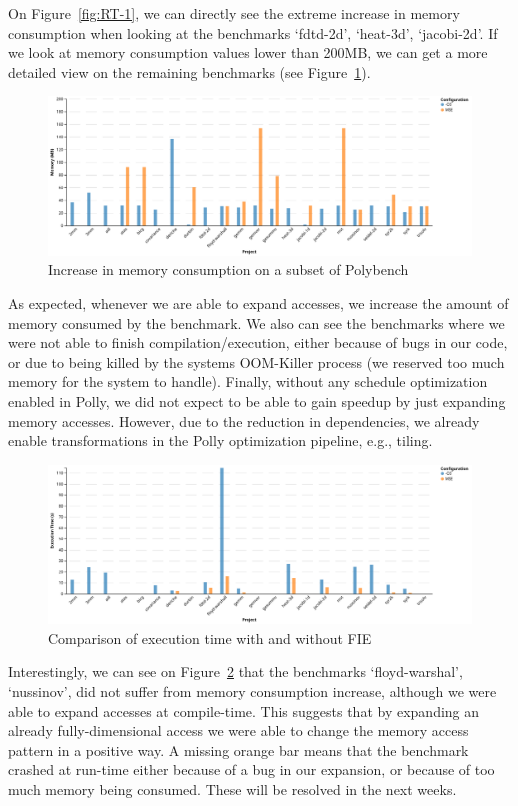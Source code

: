 On Figure~\ref{fig:RT-1}, we can directly see the extreme increase in memory consumption when looking at the benchmarks ‘fdtd-2d’, ‘heat-3d’, ‘jacobi-2d’. If we look at memory consumption values lower than 200MB, we can get a more detailed view on the remaining benchmarks (see Figure~\ref{fig:RT-2}).

\begin{figure}
\centering
\includegraphics[angle=90,origin=c,scale=0.5]{gfx/Evaluation/RT-2.png}
\caption{Increase in memory consumption on a subset of Polybench}
\label{fig:RT-2}
\end{figure}

As expected, whenever we are able to expand accesses, we increase the amount of memory consumed by the benchmark. We also can see the benchmarks where we were not able to finish compilation/execution, either because of bugs in our code, or due to being killed by the systems OOM-Killer process (we reserved too much memory for the system to handle). Finally, without any schedule optimization enabled in Polly, we did not expect to be able to gain speedup by just expanding memory accesses. However, due to the reduction in dependencies, we already enable transformations in the Polly optimization pipeline, e.g., tiling.

\begin{figure}
\centering
\includegraphics[angle=90,origin=c,scale=0.5]{gfx/Evaluation/RT-3.png}
\caption{Comparison of execution time with and without \ac{FIE}}
\label{fig:RT-3}
\end{figure}

Interestingly, we can see on Figure~\ref{fig:RT-3} that the benchmarks ‘floyd-warshal’, ‘nussinov’, did not suffer from memory consumption increase, although we were able to expand accesses at compile-time. This suggests that by expanding an already fully-dimensional access we were able to change the memory access pattern in a positive way. A missing orange bar means that the benchmark crashed at run-time either because of a bug in our expansion, or because of too much memory being consumed. These will be resolved in the next weeks.
